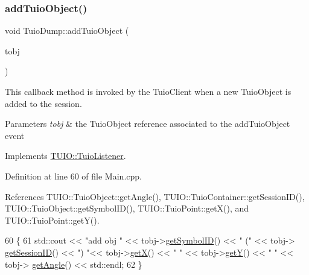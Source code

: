 \subsubsection{\texorpdfstring{add\+Tuio\+Object()}{addTuioObject()}}
{\footnotesize\ttfamily void Tuio\+Dump\+::add\+Tuio\+Object (\begin{DoxyParamCaption}\item[{\hyperlink{class_t_u_i_o_1_1_tuio_object}{Tuio\+Object} $\ast$}]{tobj }\end{DoxyParamCaption})\hspace{0.3cm}{\ttfamily [virtual]}}

This callback method is invoked by the Tuio\+Client when a new Tuio\+Object is added to the session.


\begin{DoxyParams}{Parameters}
{\em tobj} & the Tuio\+Object reference associated to the add\+Tuio\+Object event \\
\hline
\end{DoxyParams}


Implements \hyperlink{class_t_u_i_o_1_1_tuio_listener_a7180002e5898259cecdb8b614a0f67ff}{T\+U\+I\+O\+::\+Tuio\+Listener}.



Definition at line 60 of file Main.\+cpp.



References T\+U\+I\+O\+::\+Tuio\+Object\+::get\+Angle(), T\+U\+I\+O\+::\+Tuio\+Container\+::get\+Session\+I\+D(), T\+U\+I\+O\+::\+Tuio\+Object\+::get\+Symbol\+I\+D(), T\+U\+I\+O\+::\+Tuio\+Point\+::get\+X(), and T\+U\+I\+O\+::\+Tuio\+Point\+::get\+Y().


\begin{DoxyCode}
60                                              \{
61     std::cout << \textcolor{stringliteral}{"add obj "} << tobj->\hyperlink{class_t_u_i_o_1_1_tuio_object_a0d0b9b6e48c657350559acded6a1e53b}{getSymbolID}() << \textcolor{stringliteral}{" ("} << tobj->
      \hyperlink{class_t_u_i_o_1_1_tuio_container_a84c29bb63b233dbfd22811dab5b62833}{getSessionID}() << \textcolor{stringliteral}{") "}<< tobj->\hyperlink{class_t_u_i_o_1_1_tuio_point_ad5bb767c0a7b151704b59a38793345f0}{getX}() << \textcolor{stringliteral}{" "} << tobj->\hyperlink{class_t_u_i_o_1_1_tuio_point_a6c591de33c3c0f0d5e8df159ce643b7a}{getY}() << \textcolor{stringliteral}{" "} << tobj->
      \hyperlink{class_t_u_i_o_1_1_tuio_object_a7757d3c07bb7014f50bc645016d58933}{getAngle}() << std::endl;
62 \}
\end{DoxyCode}
\mbox{\label{class_tuio_dump_a8a664f2e278fac90065c57e366d4277e}} 
